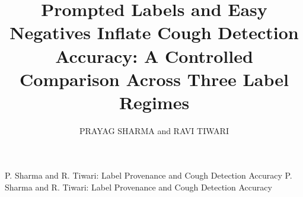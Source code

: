 
\title{Prompted Labels and Easy Negatives Inflate Cough Detection Accuracy: A Controlled
Comparison Across Three Label Regimes}
\author{\uppercase{Prayag Sharma} and \uppercase{Ravi Tiwari}}
\address[1]{School of Computer Science and Engineering (SCOPE), Vellore Institute of Technology (VIT), Chennai, Tamil Nadu, India (e-mail: prayag.sharma2024@vitstudent.ac.in)}
\address[2]{School of Electronics Engineering (SENSE), Vellore Institute of Technology (VIT), Chennai, Tamil Nadu, India (e-mail: ravi.tiwari@vit.ac.in)}

\markboth
{P. Sharma and R. Tiwari: Label Provenance and Cough Detection Accuracy}
{P. Sharma and R. Tiwari: Label Provenance and Cough Detection Accuracy}


\begin{abstract}

\end{abstract}

\begin{keywords}

\end{keywords}

\titlepgskip=-15pt

\maketitle
